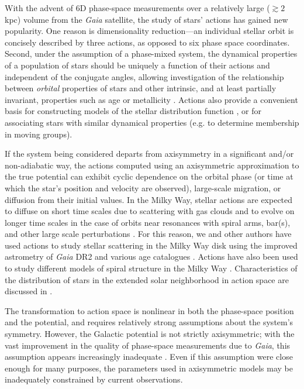 \documentclass[twocolumn]{aastex62}
\begin{document}
With the advent of 6D phase-space measurements over a relatively large
($\gtrsim 2$ kpc) volume from the \textit{Gaia} satellite, the study of stars'
actions has gained new popularity. One reason is dimensionality reduction---an
individual stellar orbit is concisely described by three actions, as opposed
to six phase space coordinates. Second, under the assumption of a phase-mixed
system, the dynamical properties of a population of stars should be uniquely a
function of their actions and independent of the conjugate angles, allowing
investigation of the relationship between \emph{orbital} properties of stars
and other intrinsic, and at least partially invariant, properties such as age
or metallicity \citep{2018ApJ...867...31B, 2018arXiv180803278T,
2018MNRAS.481.4093S, 2019arXiv190304030G, 2019arXiv190309320D,
2019MNRAS.486.1167B}. Actions also provide a convenient basis for constructing
models of the stellar distribution function
\citep[e.g.][]{1915MNRAS..76...70J, 1985ApJ...295..388V, 2017ApJ...839...61T},
or for associating stars with similar dynamical properties (e.g. to determine
membership in moving groups).

If the system being considered departs from axisymmetry in a significant
and/or non-adiabatic way, the actions computed using an axisymmetric
approximation to the true potential can exhibit cyclic dependence on the
orbital phase (or time at which the star's position and velocity are
observed), large-scale migration, or diffusion from their initial values. In
the Milky Way, stellar actions are expected to diffuse on short time scales
due to scattering with gas clouds and to evolve on longer time scales in the
case of orbits near resonances with spiral arms, bar(s), and other large scale
perturbations \citep{2014RvMP...86....1S}. For this reason, we and other
authors have used actions to study stellar scattering in the Milky Way disk
using the improved astrometry of \textit{Gaia} DR2 and various age catalogues
\citep{2018ApJ...867...31B, 2018arXiv180803278T}. Actions have also been used
to study different models of spiral structure in the Milky Way
\citep{2019MNRAS.tmp..155S}. Characteristics of the distribution of stars in
the extended solar neighborhood in action space are discussed in
\citet{2019MNRAS.484.3291T}.

The transformation to action space is nonlinear in both the phase-space
position and the potential, and requires relatively strong assumptions about
the system's symmetry. However, the Galactic potential is not strictly
axisymmetric; with the vast improvement in the quality of phase-space
measurements due to \textit{Gaia}, this assumption appears increasingly
inadequate \citep[e.g.][]{2018Natur.561..360A}. Even if this assumption were
close enough for many purposes, the parameters used in axisymmetric models may
be inadequately constrained by current observations.
\end{document}
